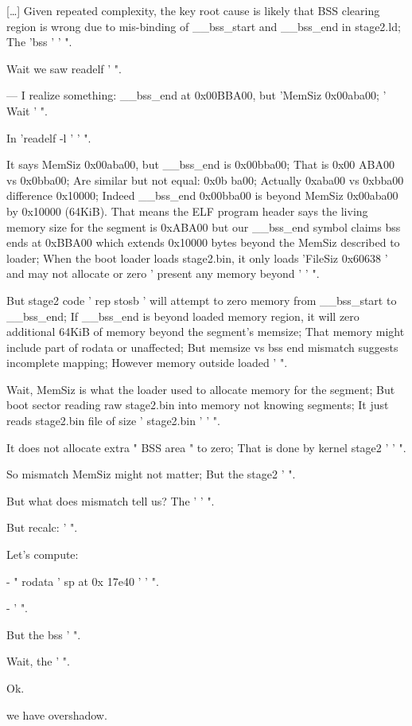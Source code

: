 \begin{decodedreasoningpanel}
{[\ldots]} Given repeated complexity, the key root cause is likely that BSS clearing region is wrong due to mis-binding of \_\_bss\_start and \_\_bss\_end in stage2.ld; The 'bss ' ' ".

Wait we saw readelf ' ".

— I realize something: \_\_bss\_end at 0x00BBA00, but 'MemSiz 0x00aba00; ' Wait ' ".

In 'readelf -l ' ' ".

It says MemSiz 0x00aba00, but \_\_bss\_end is 0x00bba00; That is 0x00 ABA00 vs 0x0bba00; Are similar but not equal: 0x0b ba00; Actually 0xaba00 vs 0xbba00 difference 0x10000; Indeed \_\_bss\_end 0x00bba00 is beyond MemSiz 0x00aba00 by 0x10000 (64KiB). That means the ELF program header says the living memory size for the segment is 0xABA00 but our \_\_bss\_end symbol claims bss ends at 0xBBA00 which extends 0x10000 bytes beyond the MemSiz described to loader; When the boot loader loads stage2.bin, it only loads 'FileSiz 0x60638 ' and may not allocate or zero ' present any memory beyond ' ' ".

But stage2 code ' rep stosb ' will attempt to zero memory from \_\_bss\_start to \_\_bss\_end; If \_\_bss\_end is beyond loaded memory region, it will zero additional 64KiB of memory beyond the segment's memsize; That memory might include part of rodata or unaffected; But memsize vs bss end mismatch suggests incomplete mapping; However memory outside loaded ' ".

Wait, MemSiz is what the loader used to allocate memory for the segment; But boot sector reading raw stage2.bin into memory not knowing segments; It just reads stage2.bin file of size ' stage2.bin ' ' ".

It does not allocate extra " BSS area " to zero; That is done by kernel stage2 ' ' ".

So mismatch MemSiz might not matter; But the stage2 ' ".

But what does mismatch tell us? The ' ' ".

But recalc: ' ".

Let's compute:

- " rodata ' sp at 0x 17e40 ' ' ".

- ' ".

But the bss ' ".

Wait, the ' ".

Ok.

we have overshadow.


\end{decodedreasoningpanel}

